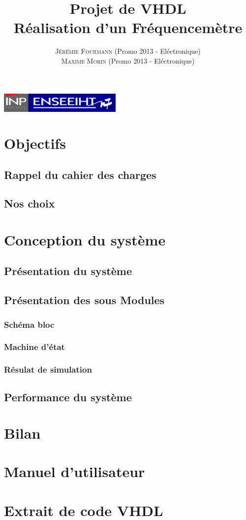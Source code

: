 \documentclass[a4paper,11pt]{article}
\title{\textbf{ \huge{Projet de VHDL}}  \\{\Large Réalisation d'un Fréquencemètre}}
\author{
\textsc{Jérémie Fourmann} (Promo 2013 - Eléctronique)\\ %
\textsc{Maxime Morin} (Promo 2013 - Eléctronique)\\ %
}
\begin{document}
\pagestyle{plain}

\maketitle
\begin{center}
\includegraphics[width=6cm]{inp-enseeiht.pdf}   
\end{center}

\vspace{1cm}
\renewcommand{\contentsname}{Plan}
\tableofcontents
\vspace{2cm}

\newpage
\section{Objectifs}
 
\subsection{Rappel du cahier des charges}
\subsection{Nos choix}

\newpage
\section{Conception du système}
\subsection{Présentation du système}
\subsection{Présentation des sous Modules}
\subsubsection{Schéma bloc}
\subsubsection{Machine d'état}
\subsubsection{Résulat de simulation}

\subsection{Performance du système}

\newpage
\section{Bilan}

\newpage
\appendix 
\section{Manuel d'utilisateur}

\newpage
\appendix 
\section{Extrait de code VHDL}

\end{document}
